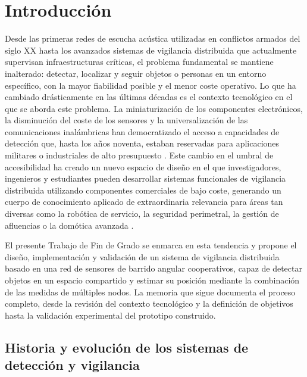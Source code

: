 \chapter{Introducción}

Desde las primeras redes de escucha acústica utilizadas en conflictos armados del siglo XX hasta los avanzados sistemas de vigilancia distribuida que actualmente supervisan infraestructuras críticas, el problema fundamental se mantiene inalterado: detectar, localizar y seguir objetos o personas en un entorno específico, con la mayor fiabilidad posible y el menor coste operativo. Lo que ha cambiado drásticamente en las últimas décadas es el contexto tecnológico en el que se aborda este problema. La miniaturización de los componentes electrónicos, la disminución del coste de los sensores y la universalización de las comunicaciones inalámbricas han democratizado el acceso a capacidades de detección que, hasta los años noventa, estaban reservadas para aplicaciones militares o industriales de alto presupuesto \cite{1,2}. Este cambio en el umbral de accesibilidad ha creado un nuevo espacio de diseño en el que investigadores, ingenieros y estudiantes pueden desarrollar sistemas funcionales de vigilancia distribuida utilizando componentes comerciales de bajo coste, generando un cuerpo de conocimiento aplicado de extraordinaria relevancia para áreas tan diversas como la robótica de servicio, la seguridad perimetral, la gestión de afluencias o la domótica avanzada \cite{3,4}.

El presente Trabajo de Fin de Grado se enmarca en esta tendencia y propone el diseño, implementación y validación de un sistema de vigilancia distribuida basado en una red de sensores de barrido angular cooperativos, capaz de detectar objetos en un espacio compartido y estimar su posición mediante la combinación de las medidas de múltiples nodos. La memoria que sigue documenta el proceso completo, desde la revisión del contexto tecnológico y la definición de objetivos hasta la validación experimental del prototipo construido.

\section{Historia y evolución de los sistemas de detección y vigilancia}


